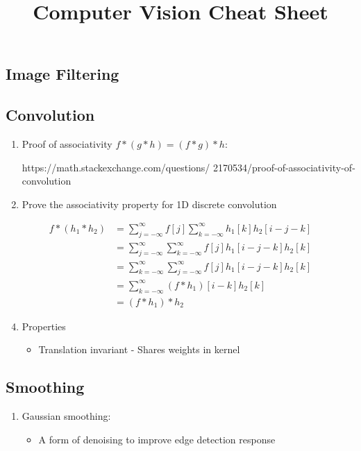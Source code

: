 \documentclass[9pt]{article}
\title{Computer Vision Cheat Sheet}
\begin{document}
\maketitle

\begin{multicols*}{2}
    \raggedcolumns

    \section{Image Filtering}
        \subsection{Convolution}
        \begin{enumerate}
            \item Proof of associativity $f \ast (g \ast h) = (f \ast g) \ast h$:
            
            https://math.stackexchange.com/questions/
            2170534/proof-of-associativity-of-convolution

            \item Prove the associativity property for 1D discrete convolution
        \end{enumerate}
        \begin{align*}
            f \ast (h_1 \ast h_2) &= \sum_{j = -\infty}^\infty f[j] \sum_{k=-\infty}^\infty h_1[k] h_2[i-j-k] \\ 
            &= \sum_{j = -\infty}^\infty \sum_{k=-\infty}^\infty f[j] h_1[i-j-k] h_2[k] \\ 
            &= \sum_{k = -\infty}^\infty \sum_{j=-\infty}^\infty f[j] h_1[i-j-k] h_2[k] \\ 
            &= \sum_{k = -\infty}^\infty (f \ast h_1)[i-k] h_2[k] \\ 
            &= (f \ast h_1) \ast h_2
        \end{align*}
        \begin{enumerate}
            \setcounter{enumi}{3}
            \item Properties
            \begin{itemize}
                \item Translation invariant - Shares weights in kernel 
            \end{itemize}
        \end{enumerate}

        \subsection{Smoothing}
        \begin{enumerate}
            \item Gaussian smoothing:
            \begin{itemize}
                \item A form of denoising to improve edge detection response 
                

\end{itemize}
\end{enumerate}
\end{multicols*}
\end{document}
